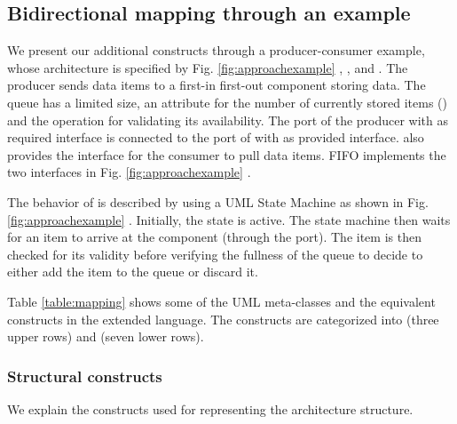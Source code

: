 \subsection{Bidirectional mapping through an example}
\label{subsec:bimapping}
We present our additional constructs through a producer-consumer example, whose architecture is specified by Fig. \ref{fig:approachexample} , , and .
The  producer sends data items to a first-in first-out component  storing data.
The  queue has a limited size, an attribute for the number of currently stored items () and the  operation for validating its availability.
The  port of the producer with  as required interface is connected to the  port of  with  as provided interface. %
 also provides the  interface for the consumer to pull data items.
FIFO implements the two interfaces in Fig. \ref{fig:approachexample} .

The behavior of  is described by using a UML State Machine as shown in Fig. \ref{fig:approachexample} .
Initially, the  state is active.
The state machine then waits for an item to arrive at the  component (through the  port).
The item is then checked for its validity before verifying the fullness of the queue to decide to either add the item to the queue or discard it.

Table \ref{table:mapping} shows some of the UML meta-classes and the equivalent constructs in the extended language.
The constructs are categorized into  (three upper rows) and  (seven lower rows).



\subsubsection{Structural constructs}
We explain the constructs used for representing the architecture structure.


